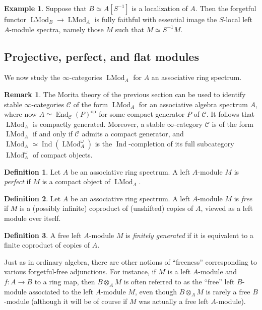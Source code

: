 \documentclass{article}
\theoremstyle{definition}
\newtheorem{definition}{Definition}[subsection]
\newtheorem{example}{Example}[subsection]
\newtheorem{remark}{Remark}[subsection]
\newcommand{\C}{\mathcal{C}}
\renewcommand{\i}{\infty}
\newcommand{\op}{\mathrm{op}}
\DeclareMathOperator{\LMod}{LMod}
\DeclareMathOperator{\End}{End}
\DeclareMathOperator{\Ind}{Ind}
\begin{document}
\begin{example}
Suppose that $B\simeq A[S^{-1}]$ is a localization of $A$.
Then the forgetful functor $\LMod_B\to\LMod_A$ is fully faithful with essential image the $S$-local left $A$-module spectra, namely those $M$ such that $M\simeq S^{-1}M$.
\end{example}



\subsection{Projective, perfect, and flat modules}

We now  study the $\infty$-categories $\LMod_A$ for $A$ an associative ring spectrum.

\begin{remark}
The Morita theory of the previous section can be used to identify stable $\i$-categories $\C$ of the form $\LMod_A$ for an associative algebra spectrum $A$, where now $A\simeq\End_\C(P)^{\op}$ for some compact generator $P$ of $\C$.
It follows that $\LMod_A$ is compactly generated.
Moreover, a stable $\infty$-category $\C$ is of the form $\LMod_A$ if and only if $\C$ admits a compact generator, and $\LMod_A\simeq\Ind(\LMod_A^\omega)$ is the $\Ind$-completion of its full subcategory $\LMod_A^\omega$ of compact objects.
\end{remark}
\begin{definition}
Let $A$ be an associative ring spectrum.
A left $A$-module $M$ is {\em perfect} if $M$ is a compact object of $\LMod_A$.
\end{definition}

\begin{definition}\label{def:freemod}
Let $A$ be an associative ring spectrum.
A left $A$-module $M$ is {\em free} if $M$ is a (possibly infinite) coproduct of (unshifted) copies of $A$, viewed as a left module over itself.
\end{definition}

\begin{definition}
A free left $A$-module $M$ is {\em finitely generated} if it is equivalent to a finite coproduct of copies of $A$.
\end{definition}

Just as in ordinary algebra, there are other notions of ``freeness'' corresponding to various forgetful-free adjunctions.
For instance, if $M$ is a left $A$-module and $f:A\to B$ to a ring map, then $B\otimes_A M$ is often referred to as the ``free'' left $B$-module associated to the left $A$-module $M$, even though $B\otimes_A M$ is rarely a free $B$-module (although it will be of course if $M$ was actually a free left $A$-module).
\end{document}
